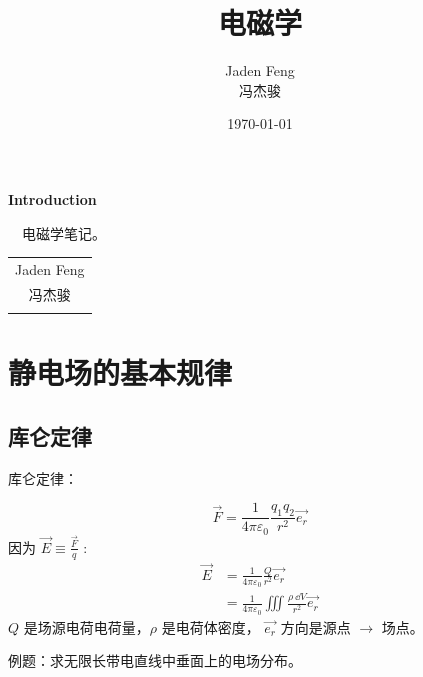 \documentclass[cn,hazy,blue,14pt,normal]{elegantnote}
\title{电磁学}
\author{Jaden Feng\\冯杰骏}
\date{}
\numberwithin{equation}{section}
\begin{document}
\maketitle
{}
\setcounter{page}{1}
\newpage
\begin{center}
    \Huge\textbf{{Introduction}}\\
\end{center}~\
电磁学笔记。
\begin{flushright}
    \begin{tabular}{c}
        Jaden Feng\\
        冯杰骏\\
        \date{\today}
    \end{tabular}
\end{flushright}

\newpage
{}
\setcounter{page}{1}
\tableofcontents

\newpage
\setcounter{page}{1}

\section{静电场的基本规律}
\newpage
\subsection{库仑定律}
\begin{theorem}
  库仑定律：
\end{theorem}
\begin{equation}
  \vec{F}=\frac{1}{4\pi\varepsilon_0}\frac{q_1q_2}{r^2}\vec{e_r}
\end{equation}
因为 $\vec{E}\equiv\frac{\vec{F}}{q}$ :
\begin{equation}\label{点电荷电场}
  \begin{aligned}
    \vec{E}&=\frac{1}{4\pi\varepsilon_0}\frac{Q}{r^2}\vec{e_r}\\
    &=\frac{1}{4\pi\varepsilon_0}\iiint\frac{\rho\ \dd V}{r^2}\vec{e_r}
  \end{aligned}
\end{equation}
$Q$ 是场源电荷电荷量，$\rho$ 是电荷体密度， $\vec{e_r}$ 方向是源点 $\to $ 场点。\\
\begin{example}\label{example1.1}
  例题：求无限长带电直线中垂面上的电场分布。
\end{example}
\end{document}
